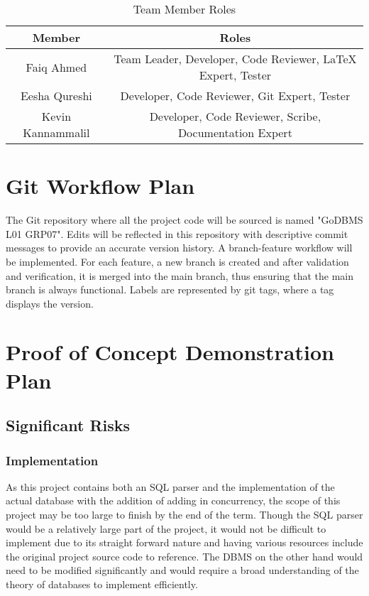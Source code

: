 \documentclass[12pt,letterpaper]{article}
\begin{document}
\begin{table}[H]
    \centering
    \begin{tabular}{ |c|c| } 
    \hline
    Member & Roles \\
    \hline
    Faiq Ahmed & Team Leader, Developer, Code Reviewer, LaTeX Expert, Tester\\
    Eesha Qureshi & Developer, Code Reviewer, Git Expert, Tester \\
    Kevin Kannammalil & Developer, Code Reviewer, Scribe, Documentation Expert \\
    \hline
    \end{tabular}
    \caption{Team Member Roles}
    \label{tab:memberroles}
\end{table}

\section{Git Workflow Plan}

The Git repository where all the project code will be sourced is named "GoDBMS L01 GRP07". Edits will be reflected in this repository with descriptive commit messages to provide an accurate version history. A branch-feature workflow will be implemented. For each feature, a new branch is created and after validation and verification, it is merged into the main branch, thus ensuring that the main branch is always functional. Labels are represented by git tags, where a tag displays the version.  

\section{Proof of Concept Demonstration Plan}

\subsection{Significant Risks}

\subsubsection{Implementation}

As this project contains both an SQL parser and the implementation of the actual database with the addition of adding in concurrency, the scope of this project may be too large to finish by the end of the term. Though the SQL parser would be a relatively large part of the project, it would not be difficult to implement due to its straight forward nature and having various resources include the original project source code to reference. The DBMS on the other hand would need to be modified significantly and would require a broad understanding of the theory of databases to implement efficiently.
\end{document}
